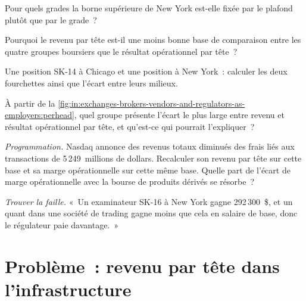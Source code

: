 \begin{exercise}[$\star$]\label{exo:in:exchanges-brokers-vendors-and-regulators-as-employers:3}
Pour quels grades la borne supérieure de New York est-elle fixée par le plafond plutôt que par le grade~?
\end{exercise}

\begin{exercise}[$\star\star$]\label{exo:in:exchanges-brokers-vendors-and-regulators-as-employers:4}
Pourquoi le revenu par tête est-il une moins bonne base de comparaison entre les quatre groupes boursiers que le résultat opérationnel par tête~?
\end{exercise}

\begin{exercise}[$\star\star$]\label{exo:in:exchanges-brokers-vendors-and-regulators-as-employers:5}
Une position SK-14 à Chicago et une position à New York~: calculer les deux fourchettes ainsi que l'écart entre leurs milieux.
\end{exercise}

\begin{exercise}[$\star\star$]\label{exo:in:exchanges-brokers-vendors-and-regulators-as-employers:6}
À partir de la \cref{fig:in:exchanges-brokers-vendors-and-regulators-as-employers:perhead}, quel groupe présente l'écart le plus large
entre revenu et résultat opérationnel par tête, et qu'est-ce qui pourrait l'expliquer~?
\end{exercise}

\begin{exercise}[$\star\star\star$]\label{exo:in:exchanges-brokers-vendors-and-regulators-as-employers:7}
\emph{Programmation.} Nasdaq annonce des revenus totaux diminués des frais liés aux transactions de 5\,249~millions de dollars. Recalculer son revenu par
tête sur cette base et sa marge opérationnelle sur cette même base. Quelle part de l'écart de marge opérationnelle avec la bourse de produits dérivés se résorbe~?
\end{exercise}

\begin{exercise}[$\star\star\star$]\label{exo:in:exchanges-brokers-vendors-and-regulators-as-employers:8}
\emph{Trouver la faille.} «~Un examinateur SK-16 à New York gagne 292\,300~\$, et un quant dans une société de trading gagne moins que cela
en salaire de base, donc le régulateur paie davantage.~»
\end{exercise}

\section{Problème~: revenu par tête dans l'infrastructure}

